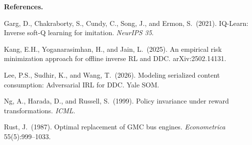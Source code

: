 \documentclass[10pt]{article}
\begin{document}
\bigskip\noindent\textbf{References.}

\smallskip\noindent Garg, D., Chakraborty, S., Cundy, C., Song, J., and Ermon, S.\ (2021). IQ-Learn: Inverse soft-Q learning for imitation. \textit{NeurIPS 35}.

\smallskip\noindent Kang, E.H., Yoganarasimhan, H., and Jain, L.\ (2025). An empirical risk minimization approach for offline inverse RL and DDC. arXiv:2502.14131.

\smallskip\noindent Lee, P.S., Sudhir, K., and Wang, T.\ (2026). Modeling serialized content consumption: Adversarial IRL for DDC. Yale SOM.

\smallskip\noindent Ng, A., Harada, D., and Russell, S.\ (1999). Policy invariance under reward transformations. \textit{ICML}.

\smallskip\noindent Rust, J.\ (1987). Optimal replacement of GMC bus engines. \textit{Econometrica} 55(5):999--1033.
\end{document}
